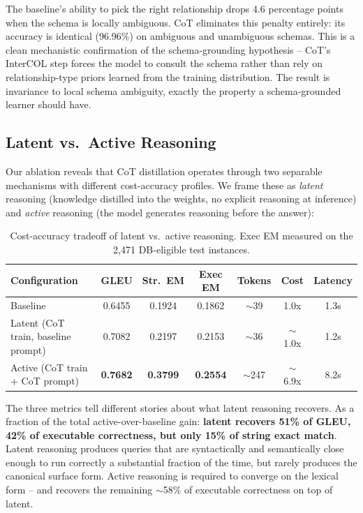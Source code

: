 \documentclass[11pt]{article}
\begin{document}
The baseline's ability to pick the right relationship drops 4.6 percentage points when the schema is locally ambiguous. CoT eliminates this penalty entirely: its accuracy is identical (96.96\%) on ambiguous and unambiguous schemas. This is a clean mechanistic confirmation of the schema-grounding hypothesis -- CoT's InterCOL step forces the model to consult the schema rather than rely on relationship-type priors learned from the training distribution. The result is invariance to local schema ambiguity, exactly the property a schema-grounded learner should have.

\subsection{Latent vs.\ Active Reasoning}

Our ablation reveals that CoT distillation operates through two separable mechanisms with different cost-accuracy profiles. We frame these as \emph{latent} reasoning (knowledge distilled into the weights, no explicit reasoning at inference) and \emph{active} reasoning (the model generates reasoning before the answer):

\begin{table}[h]
\centering
\small
\caption{Cost-accuracy tradeoff of latent vs.\ active reasoning. Exec EM measured on the 2{,}471 DB-eligible test instances.}
\label{tab:latent_active}
\begin{tabular}{lcccccc}
\toprule
\textbf{Configuration} & \textbf{GLEU} & \textbf{Str.\ EM} & \textbf{Exec EM} & \textbf{Tokens} & \textbf{Cost} & \textbf{Latency} \\
\midrule
Baseline & 0.6455 & 0.1924 & 0.1862 & ${\sim}$39 & 1.0x & 1.3s \\
Latent (CoT train, baseline prompt) & 0.7082 & 0.2197 & 0.2153 & ${\sim}$36 & ${\sim}$1.0x & 1.2s \\
Active (CoT train + CoT prompt) & \textbf{0.7682} & \textbf{0.3799} & \textbf{0.2554} & ${\sim}$247 & ${\sim}$6.9x & 8.2s \\
\bottomrule
\end{tabular}
\end{table}

The three metrics tell different stories about what latent reasoning recovers. As a fraction of the total active-over-baseline gain: \textbf{latent recovers 51\% of GLEU, 42\% of executable correctness, but only 15\% of string exact match}. Latent reasoning produces queries that are syntactically and semantically close enough to run correctly a substantial fraction of the time, but rarely produces the canonical surface form. Active reasoning is required to converge on the lexical form -- and recovers the remaining ${\sim}$58\% of executable correctness on top of latent.
\end{document}
